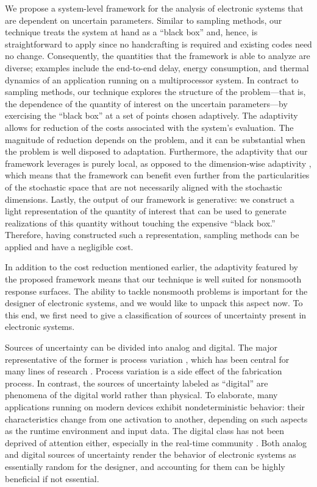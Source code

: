 We propose a system-level framework for the analysis of electronic systems that
are dependent on uncertain parameters. Similar to sampling methods, our
technique treats the system at hand as a ``black box'' and, hence, is
straightforward to apply since no handcrafting is required and existing codes
need no change. Consequently, the quantities that the framework is able to
analyze are diverse; examples include the end-to-end delay, energy consumption,
and thermal dynamics of an application running on a multiprocessor system. In
contract to sampling methods, our technique explores the structure of the
problem---that is, the dependence of the quantity of interest on the uncertain
parameters---by exercising the ``black box'' at a set of points chosen
adaptively. The adaptivity allows for reduction of the costs associated with the
system's evaluation. The magnitude of reduction depends on the problem, and it
can be substantial when the problem is well disposed to adaptation. Furthermore,
the adaptivity that our framework leverages is purely local, as opposed to the
dimension-wise adaptivity \cite{klimke2006}, which means that the framework can
benefit even further from the particularities of the stochastic space that are
not necessarily aligned with the stochastic dimensions. Lastly, the output of
our framework is generative: we construct a light representation of the quantity
of interest that can be used to generate realizations of this quantity without
touching the expensive ``black box.'' Therefore, having constructed such a
representation, sampling methods can be applied and have a negligible cost.

In addition to the cost reduction mentioned earlier, the adaptivity featured by
the proposed framework means that our technique is well suited for nonsmooth
response surfaces. The ability to tackle nonsmooth problems is important for the
designer of electronic systems, and we would like to unpack this aspect now. To
this end, we first need to give a classification of sources of uncertainty
present in electronic systems.

Sources of uncertainty can be divided into analog and digital. The major
representative of the former is process variation \cite{srivastava2005}, which
has been central for many lines of research \cite{bhardwaj2008, juan2012,
lee2013, ukhov2014, ukhov2015}. Process variation is a side effect of the
fabrication process. In contrast, the sources of uncertainty labeled as
``digital'' are phenomena of the digital world rather than physical. To
elaborate, many applications running on modern devices exhibit nondeterministic
behavior: their characteristics change from one activation to another, depending
on such aspects as the runtime environment and input data. The digital class has
not been deprived of attention either, especially in the real-time community
\cite{quinton2012, diaz2002, santinelli2011, yang2013, tanasa2015}. Both analog
and digital sources of uncertainty render the behavior of electronic systems as
essentially random for the designer, and accounting for them can be highly
beneficial if not essential.


